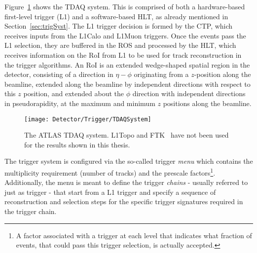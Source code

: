 		Figure~\ref{fig:TDAQSyst} shows the \ac{TDAQ} system. This is comprised of both a hardware-based first-level trigger (\ac{L1}) and a software-based \ac{HLT}, as already mentioned in Section~\ref{sec:trigSyst}. The \ac{L1} trigger decision is formed by the \ac{CTP}, which receives inputs from the \ac{L1Calo} and \ac{L1Muon} triggers. Once the events pass the \ac{L1} selection, they are buffered in the \ac{ROS} and processed by the \ac{HLT}, which receives information on the \ac{RoI} from \ac{L1} to be used for track reconstruction in the trigger algorithms.
		An \ac{RoI} is an extended wedge-shaped spatial region in the detector, consisting of a direction in $\eta-\phi$ originating from a $z$-position along the beamline, extended along the beamline by independent directions with respect to this $z$ position, and extended about the $\phi$ direction with independent directions in pseudorapidity, at the maximum and minimum $z$ positions along the beamline. %

		\begin{figure}[!htb]
			\centering
			\texttt{[image: Detector/Trigger/TDAQSystem]}
			\caption{The \ac{ATLAS} \ac{TDAQ} system. \acs{L1Topo} and \ac{FTK}~\cite{ATLASTrigger2015} have not been used for the results shown in this thesis.}
			\label{fig:TDAQSyst}
		\end{figure}

		The trigger system is configured via the so-called trigger \textit{menu} which contains the multiplicity requirement (number of tracks) and the prescale factors\footnote{A factor associated with a trigger at each level that indicates what fraction of events, that could pass this trigger selection, is actually accepted.}. Additionally, the menu is meant to define the trigger \textit{chains} - usually referred to just as trigger - that start from a \ac{L1} trigger and specify a sequence of reconstruction and selection steps for the specific trigger signatures required in the trigger chain. 

